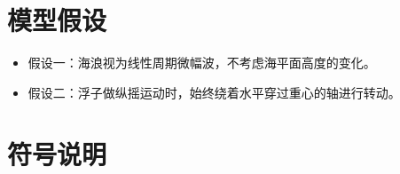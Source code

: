 \documentclass{article}
\numberwithin{equation}{subsection}
\begin{document}
\newpage

{\centering\section{模型假设}}

\begin{itemize}
    \item 假设一：海浪视为线性周期微幅波，不考虑海平面高度的变化。
    \item 假设二：浮子做纵摇运动时，始终绕着水平穿过重心的轴进行转动。
\end{itemize}



{\centering\section{符号说明}}
\end{document}
